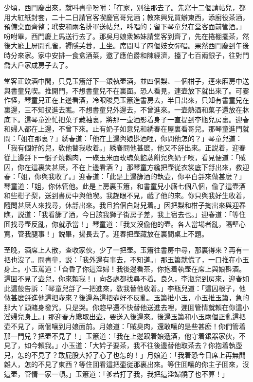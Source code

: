 少頃，西門慶出來，就呌書童吩咐：「在家，别往那去了。先寫十二個請帖兒，都用大紅紙封套，二十二日請官客喫慶官哥兒酒；教來興兒買辦東西，添廚役茶酒，預備桌面齊整；玳安和兩名排軍送帖兒，呌唱的；留下琴童兒在堂客面前管酒。」吩咐畢，西門慶上馬送行去了。那吳月娘衆姊妹請堂客到齊了，先在捲棚擺茶，然後大廳上屏開孔雀，褥隱芙蓉，上坐。席間叫了四個妓女彈唱。果然西門慶到午後時分來家。家中安排一食盒酒菜，邀了應伯爵和陳經濟，擡了七百兩銀子，往對門喬大戶家成房子去了。

堂客正飲酒中間，只見玉簫㧱下一銀執壶酒，並四個梨、一個柑子，逕來廂房中送與書童兒喫。推開門，不想書童兒不在裏面。恐人看見，連壶放下就出來了。可霎作怪，琴童兒正在上邊看酒，冷眼睃見玉簫進書房去，半日出來，只知有書童兒在裏邊，三不知扠進去瞧。不想書童兒外邊去，不曾進來。一壶熱酒和菓子還放在牀底下。這琴童連忙把菓子藏袖裏，將那一壶酒影着身子一直提到李瓶兒房裏。迎春和婦人都在上邊，不曾下來。止有奶子如意兒和綉春在屋裏看哥兒。那琴童進門就問：「姐在那裏？」綉春道：「他在上邊與娘斟酒哩，你問他怎的？」琴童兒道：「我有個好的兒，敎他替我收着。」綉春問他甚麽，他又不㧱出來。正説着，迎春從上邊㧱下一盤子燒鵝肉，一碟玉米面玫瑰菓餡蒸餅兒與奶子喫，看見便道：「賊囚，你在這裏笑甚麽，不在上邊看酒？」那琴童方纔把壶従衣裳底下㧱出來，教迎春：「姐，你與我收了。」迎春道：「此是上邊篩酒的執壶，你平白㧱來做甚麽？」琴童道：「姐，你休管他。此是上房裏玉簫，和書童兒小廝七個八個，偸了這壶酒和些柑子梨，送到書房中與他喫。我趕眼不見，戲了他的來。你只與我好生收着，隨問甚麽人來找尋，休㧱出來。我且拾個白財兒着。」因把梨和柑子掏出來與迎春瞧，説道：「我看篩了酒，今日該我獅子街房子差，我上宿去也。」迎春道：「等住囬找尋壶反亂，你就承當！」琴童道：「我又沒偸他的壶。各人當場者亂，隔壁心寬，管我腿事！」説畢，揚長去了。迎春把壶藏放在裏間桌上不題。

至晚，酒席上人散，查收家伙，少了一把壶。玉簫往書房中尋，那裏得來？再有一把也沒了。問書童，説：「我外邊有事去，不知道。」那玉簫就慌了，一口推在小玉身上。小玉罵道：「㒲昏了你這淫婦！我後邊看茶，你抱着執壶在席上與娘斟酒。這囬不見了壶兒，你來賴我！」向各處都找尋不着。良久，李瓶兒到房來，迎春如此這般告訴：「琴童兒㧱了一把進來，敎我替他收着。」李瓶兒道：「這囚根子，他做甚麽㧱進他這把壺來？後邊為這把壺好不反亂。玉簫推小玉，小玉推玉簫，急的那大丫頭賭身發咒，只是哭。你趂早還不快替他送進去哩，遲囬管情就賴在你這小淫婦兒身上。」那迎春方纔取出壶，要送入後邊來。後邊玉簫和小玉兩個正亂這把壶不見了，兩個嚷到月娘面前。月娘道：「賊臭肉，還敢嚷的是些甚麽！你們管着那一門兒？把壶不見了！」玉簫道：「我在上邊跟着娘遞酒，他守着銀器家伙，不見了，如今賴我。」小玉道：「大妗子要茶，我不往後邊替他取茶去？你抱着執壺兒，怎的不見了？敢屁股大掉了心了也怎的！」月娘道：「我着恐今日席上再無閒雜人，怎的不見了東西？等住囬看這把壷従那裏出來。等住囬嚷的你主子囬來，沒這壶，管情一家一頓。」玉簫道：「爹若打了我，我把這淫婦饒了也不算！」

